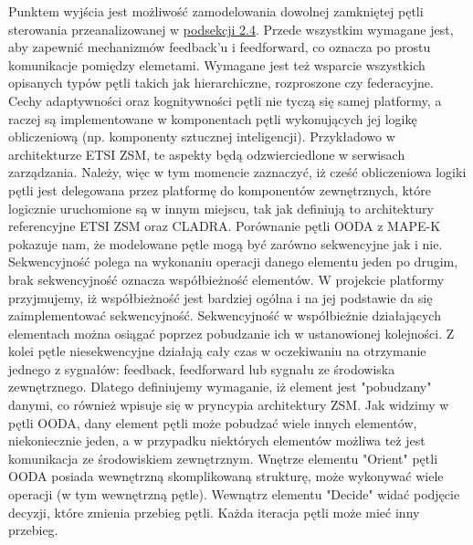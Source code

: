 Punktem wyjścia jest możliwość zamodelowania dowolnej zamkniętej pętli sterowania przeanalizowanej w \hyperlink{sec:25}{podsekcji 2.4}. Przede wszystkim wymagane jest, aby zapewnić  mechanizmów feedback'u i feedforward, co oznacza po prostu komunikacje pomiędzy elemetami. Wymagane jest też wsparcie wszystkich opisanych typów pętli takich jak hierarchiczne, rozproszone czy federacyjne. Cechy adaptywności oraz kognitywności pętli nie tyczą się samej platformy, a raczej są implementowane w komponentach pętli wykonujących jej logikę obliczeniową (np. komponenty sztucznej inteligencji). Przykładowo w architekturze ETSI ZSM, te aspekty będą odzwierciedlone w serwisach zarządzania. Należy, więc w tym momencie zaznaczyć, iż cześć obliczeniowa logiki pętli jest delegowana przez platformę do komponentów zewnętrznych, które logicznie uruchomione są w innym miejscu, tak jak definiują to architektury referencyjne ETSI ZSM oraz CLADRA. Porównanie pętli OODA z MAPE-K pokazuje nam, że modelowane pętle mogą być zarówno sekwencyjne jak i nie. Sekwencyjność polega na wykonaniu operacji danego elementu jeden po drugim, brak sekwencyjność oznacza współbieżność elementów. W projekcie platformy przyjmujemy, iż współbieżność jest bardziej ogólna i na jej podstawie da się zaimplementować sekwencyjność. Sekwencyjność w współbieżnie działających elementach można osiągać poprzez pobudzanie ich w ustanowionej kolejności. Z kolei pętle niesekwencyjne działają cały czas w oczekiwaniu na otrzymanie jednego z sygnałów: feedback, feedforward lub sygnału ze środowiska zewnętrznego. Dlatego definiujemy wymaganie, iż element jest "pobudzany" danymi, co również wpisuje się w pryncypia architektury ZSM. Jak widzimy w pętli OODA, dany element pętli może pobudzać wiele innych elementów, niekoniecznie jeden, a w przypadku niektórych elementów możliwa też jest komunikacja ze środowiskiem zewnętrznym. Wnętrze elementu "Orient" pętli OODA posiada wewnętrzną skomplikowaną strukturę, może wykonywać wiele operacji (w tym wewnętrzną pętle). Wewnątrz elementu "Decide" widać podjęcie decyzji, które zmienia przebieg pętli. Każda iteracja pętli może mieć inny przebieg. 

